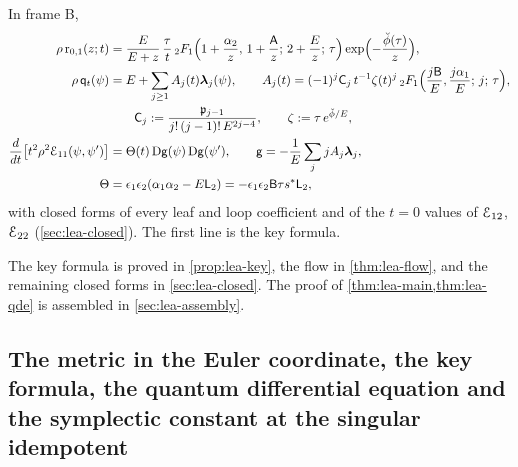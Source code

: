 \begin{thm}
\label{thm:lea-closed}
In frame B,
\begin{align*}
\rho\,\mathrm{r}_{0,1}(z;t) &= \frac{E}{E+z}\,\frac{\tau}{t}\,{}_2F_1\Bigl(1+\frac{\alpha_2}{z},\,1+\frac{\mathsf{A}}{z};\,2+\frac{E}{z};\,\tau\Bigr)\exp\Bigl(-\frac{\breve{\phi}(\tau)}{z}\Bigr),\\
\rho\,\mathsf{q}_{t}(\psi) &= E + \sum_{j\geq 1}A_j(t)\boldsymbol{\lambda}_j(\psi),\qquad A_j(t) = (-1)^j\mathsf{C}_j\,t^{-1}\zeta(t)^j\,{}_2F_1\Bigl(\frac{j\mathsf{B}}{E},\frac{j\alpha_1}{E};\,j;\,\tau\Bigr),\\
&\qquad \mathsf{C}_j := \frac{\mathfrak{p}_{j-1}}{j!\,(j-1)!\,E^{2j-4}},\qquad \zeta := \tau\,e^{\breve{\phi}/E},\\
\frac{d}{dt}\bigl[t^2\rho^2\mathcal{E}_{11}(\psi,\psi')\bigr] &= \Theta(t)\,\mathrm{D}\mathsf{g}(\psi)\,\mathrm{D}\mathsf{g}(\psi'),\qquad \mathsf{g} = -\frac{1}{E}\sum_j jA_j\boldsymbol{\lambda}_j,\\
\Theta &= \epsilon_1\epsilon_2(\alpha_1\alpha_2 - E\mathsf{L}_2) = -\epsilon_1\epsilon_2\mathsf{B}\tau s^{\ast}\mathsf{L}_2,
\end{align*}
with closed forms of every leaf and loop coefficient and of the $t = 0$ values of $\mathcal{E}_{12}$, $\mathcal{E}_{22}$ (\cref{sec:lea-closed}). The first line is the key formula.
\end{thm}

The key formula is proved in \cref{prop:lea-key}, the flow in \cref{thm:lea-flow}, and the remaining closed forms in \cref{sec:lea-closed}. The proof of \cref{thm:lea-main,thm:lea-qde} is assembled in \cref{sec:lea-assembly}.

\subsection{The metric in the Euler coordinate, the key formula, the quantum differential equation and the symplectic constant at the singular idempotent}
\label{sec:lea-qde}

